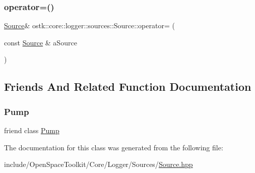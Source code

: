 \mbox{\label{classostk_1_1core_1_1logger_1_1sources_1_1_source_a17c7f7ee66390536117fc77c997172be}} 
\subsubsection{\texorpdfstring{operator=()}{operator=()}}
{\footnotesize\ttfamily \hyperlink{classostk_1_1core_1_1logger_1_1sources_1_1_source}{Source}\& ostk\+::core\+::logger\+::sources\+::\+Source\+::operator= (\begin{DoxyParamCaption}\item[{const \hyperlink{classostk_1_1core_1_1logger_1_1sources_1_1_source}{Source} \&}]{a\+Source }\end{DoxyParamCaption})\hspace{0.3cm}{\ttfamily [default]}}



\subsection{Friends And Related Function Documentation}
\mbox{\label{classostk_1_1core_1_1logger_1_1sources_1_1_source_a64fbdb62a5c5f27e0d022da36aab93d9}} 
\subsubsection{\texorpdfstring{Pump}{Pump}}
{\footnotesize\ttfamily friend class \hyperlink{classostk_1_1core_1_1logger_1_1_pump}{Pump}\hspace{0.3cm}{\ttfamily [friend]}}



The documentation for this class was generated from the following file\+:\begin{DoxyCompactItemize}
\item 
include/\+Open\+Space\+Toolkit/\+Core/\+Logger/\+Sources/\hyperlink{_sources_2_source_8hpp}{Source.\+hpp}\end{DoxyCompactItemize}
